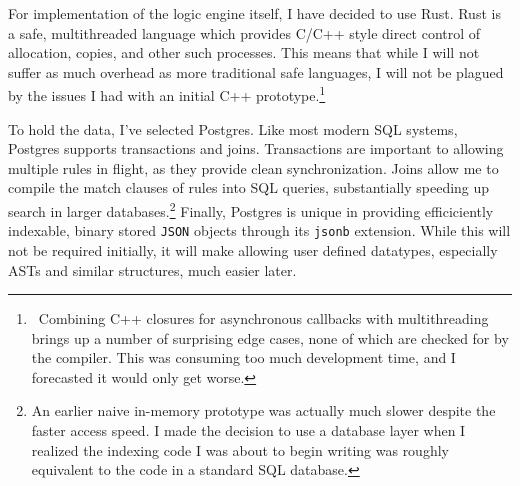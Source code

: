 For implementation of the logic engine itself, I have decided to use Rust.
Rust is a safe, multithreaded language which provides C/C++ style direct control of allocation, copies, and other such processes.
This means that while I will not suffer as much overhead as more traditional safe languages, I will not be plagued by the issues I had with an initial C++ prototype.\footnote{\
        Combining C++ closures for asynchronous callbacks with multithreading brings up a number of surprising edge cases, none of which are checked for by the compiler.
        This was consuming too much development time, and I forecasted it would only get worse.
}

To hold the data, I've selected Postgres.
Like most modern SQL systems, Postgres supports transactions and joins.
Transactions are important to allowing multiple rules in flight, as they provide clean synchronization.
Joins allow me to compile the match clauses of rules into SQL queries, substantially speeding up search in larger databases.\footnote{
        An earlier naive in-memory prototype was actually much slower despite the faster access speed.
I made the decision to use a database layer when I realized the indexing code I was about to begin writing was roughly equivalent to the code in a standard SQL database.
}
Finally, Postgres is unique in providing efficiciently indexable, binary stored \texttt{JSON} objects through its \texttt{jsonb} extension.
While this will not be required initially, it will make allowing user defined datatypes, especially ASTs and similar structures, much easier later.

